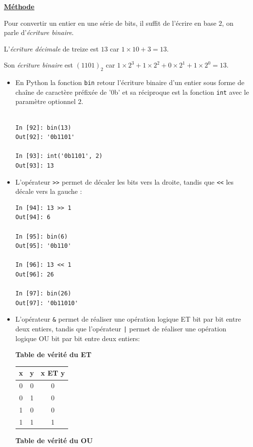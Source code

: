 \documentclass[a4paper, french, 12pt]{article}  %
\newcounter{act}
\newenvironment{methode}[1]
{\par \medskip   \begin{framed} \noindent\underline{\textbf{Méthode}} \hspace{0.5cm}{\itshape #1} \vspace*{10pt} \par  }
{\end{framed} \par \medskip }
\begin{document}
\begin{methode}{Opérateurs bit à bit}
Pour convertir un entier en une série de bits, il suffit de l'écrire en base $2$, on parle d'\textit{écriture binaire}. 

L'\textit{écriture décimale }de treize est $13$ car $1 \times 10 + 3 = 13$.

Son  \textit{écriture binaire}  est $(1101)_{2}$ car $1 \times 2^{3} + 1 \times 2^{2} + 0 \times 2^{1} + 1 \times 2^{0} = 13$.

\begin{itemize}
\item En Python la fonction \texttt{bin} retour l'écriture binaire d'un entier sous forme de chaîne de caractère préfixée de '0b' et sa réciproque est la fonction \texttt{int} avec le paramètre optionnel $2$.
\begin{lstlisting}[numbers=none]

In [92]: bin(13)
Out[92]: '0b1101'

In [93]: int('0b1101', 2)
Out[93]: 13
\end{lstlisting}

\item L'opérateur \texttt{>>} permet de décaler les bits vers la droite, tandis que \texttt{<<} les décale vers la gauche :
\begin{lstlisting}[numbers=none]
In [94]: 13 >> 1
Out[94]: 6

In [95]: bin(6)
Out[95]: '0b110'

In [96]: 13 << 1
Out[96]: 26

In [97]: bin(26)
Out[97]: '0b11010'
\end{lstlisting}

\item L'opérateur \verb+&+ permet de réaliser une opération logique ET bit par bit entre deux entiers, tandis que l'opérateur \verb+|+ permet de réaliser une opération logique OU bit par bit  entre deux entiers:

\medskip

\begin{minipage}{0.4\linewidth}
\begin{center}
\textbf{Table de vérité du ET}

\medskip
\begin{tabular}{|c|c|c|}
\hline
x &  y & x ET y \\
\hline
0 & 0 &  0 \\
\hline
0 & 1 & 0 \\
\hline
1 & 0 & 0 \\
\hline
1 & 1 & 1\\
\hline
\end{tabular}
\end{center}
\end{minipage}\hfill
\begin{minipage}{0.4\linewidth}
\begin{center}
\textbf{Table de vérité du OU}


\end{center}
\end{minipage}
\end{itemize}
\end{methode}
\end{document}

